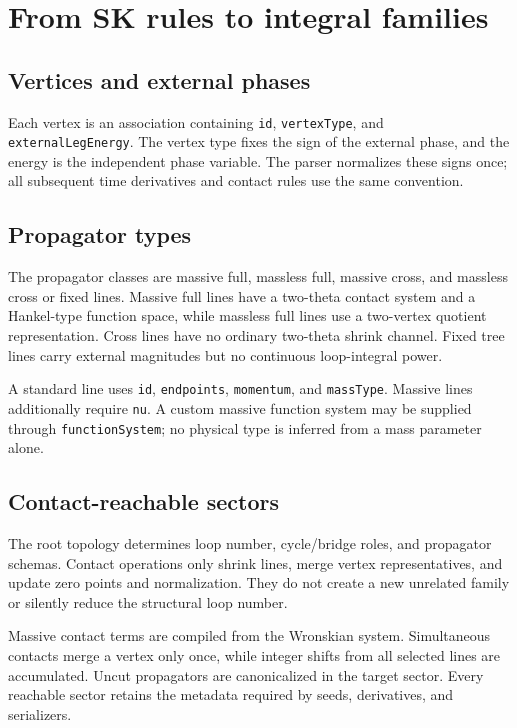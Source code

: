 ﻿\documentclass[a4paper,11pt]{article}
\begin{document}
\section{From SK rules to integral families}

\subsection{Vertices and external phases}

Each vertex is an association containing \texttt{id}, \texttt{vertexType}, and
\texttt{externalLegEnergy}. The vertex type fixes the sign of the external phase, and the
energy is the independent phase variable. The parser normalizes these signs once; all
subsequent time derivatives and contact rules use the same convention.

\subsection{Propagator types}

The propagator classes are massive full, massless full, massive cross, and massless
cross or fixed lines. Massive full lines have a two-theta contact system and a Hankel-type
function space, while massless full lines use a two-vertex quotient representation. Cross
lines have no ordinary two-theta shrink channel. Fixed tree lines carry external magnitudes
but no continuous loop-integral power.

A standard line uses \texttt{id}, \texttt{endpoints}, \texttt{momentum}, and
\texttt{massType}. Massive lines additionally require \texttt{nu}. A custom massive
function system may be supplied through \texttt{functionSystem}; no physical type is
inferred from a mass parameter alone.

\subsection{Contact-reachable sectors}

The root topology determines loop number, cycle/bridge roles, and propagator schemas.
Contact operations only shrink lines, merge vertex representatives, and update zero points
and normalization. They do not create a new unrelated family or silently reduce the
structural loop number.

Massive contact terms are compiled from the Wronskian system. Simultaneous contacts merge
a vertex only once, while integer shifts from all selected lines are accumulated. Uncut
propagators are canonicalized in the target sector. Every reachable sector retains the
metadata required by seeds, derivatives, and serializers.
\end{document}
